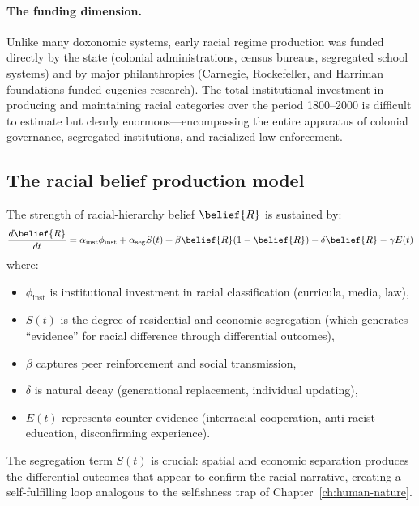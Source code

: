 \paragraph{The funding dimension.}
Unlike many doxonomic systems, early racial regime production was funded directly by the state (colonial administrations, census bureaus, segregated school systems) and by major philanthropies (Carnegie, Rockefeller, and Harriman foundations funded eugenics research).
The total institutional investment in producing and maintaining racial categories over the period 1800--2000 is difficult to estimate but clearly enormous---encompassing the entire apparatus of colonial governance, segregated institutions, and racialized law enforcement.

\subsection{The racial belief production model}

\begin{model}
\label{mod:racial-production}
The strength of racial-hierarchy belief $\belief{R}$ is sustained by:
\[
  \frac{d\belief{R}}{dt} = \alpha_{\text{inst}} \phi_{\text{inst}} + \alpha_{\text{seg}} S(t) + \beta \belief{R}(1-\belief{R}) - \delta \belief{R} - \gamma E(t)
\]
where:
\begin{itemize}[nosep]
  \item $\phi_{\text{inst}}$ is institutional investment in racial classification (curricula, media, law),
  \item $S(t)$ is the degree of residential and economic segregation (which generates ``evidence'' for racial difference through differential outcomes),
  \item $\beta$ captures peer reinforcement and social transmission,
  \item $\delta$ is natural decay (generational replacement, individual updating),
  \item $E(t)$ represents counter-evidence (interracial cooperation, anti-racist education, disconfirming experience).
\end{itemize}
\end{model}

The segregation term $S(t)$ is crucial: spatial and economic separation produces the differential outcomes that appear to confirm the racial narrative, creating a self-fulfilling loop analogous to the selfishness trap of Chapter~\ref{ch:human-nature}.

